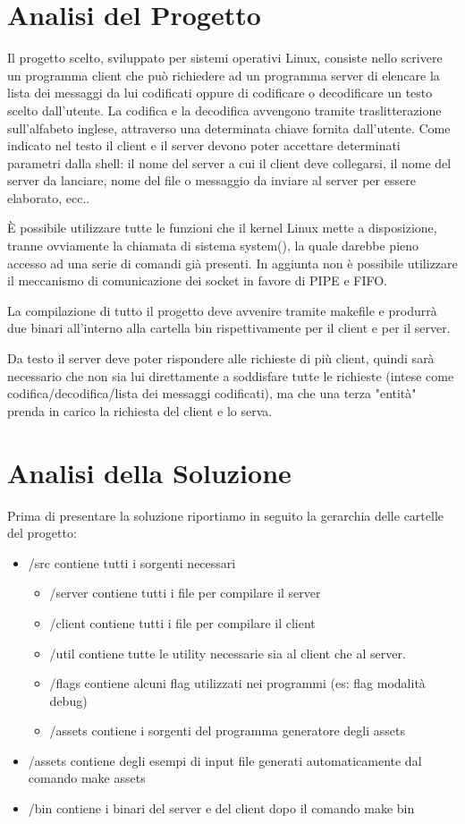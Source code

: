 \documentclass[12pt]{article}
\begin{document}


\section{Analisi del Progetto}
Il progetto scelto, sviluppato per sistemi operativi Linux, consiste nello scrivere un programma client che può richiedere ad un programma server di elencare la lista dei messaggi da lui codificati oppure di codificare o decodificare un testo scelto dall'utente. La codifica e la decodifica avvengono tramite traslitterazione sull'alfabeto inglese, attraverso una determinata chiave fornita dall'utente. Come indicato nel testo il client e il server devono poter accettare determinati parametri dalla shell: il nome del server a cui il client deve collegarsi, il nome del server da lanciare, nome del file o messaggio da inviare al server per essere elaborato, ecc..

È possibile utilizzare tutte le funzioni che il kernel Linux mette a disposizione, tranne ovviamente la chiamata di sistema system(), la quale darebbe pieno accesso ad una serie di comandi già presenti. In aggiunta non è possibile utilizzare il meccanismo di comunicazione dei socket in favore di PIPE e FIFO.

La compilazione di tutto il progetto deve avvenire tramite makefile e produrrà due binari all'interno alla cartella bin rispettivamente per il client e per il server.

Da testo il server deve poter rispondere alle richieste di più client, quindi sarà necessario che non sia lui direttamente a soddisfare tutte le richieste (intese come codifica/decodifica/lista dei messaggi codificati), ma che una terza "entità" prenda in carico la richiesta del client e lo serva.

\section{Analisi della Soluzione}
Prima di presentare la soluzione riportiamo in seguito la gerarchia delle cartelle del progetto:
\begin{itemize}
    \item /src contiene tutti i sorgenti necessari
    \begin{itemize}
        \item /server contiene tutti i file per compilare il server
        \item /client contiene tutti i file per compilare il client
        \item /util contiene tutte le utility necessarie sia al client che al server.
        \item /flags contiene alcuni flag utilizzati nei programmi (es: flag modalità debug)
        \item /assets contiene i sorgenti del programma generatore degli assets
    \end{itemize}
    \item /assets contiene degli esempi di input file generati automaticamente dal comando make assets
    \item /bin contiene i binari del server e del client dopo il comando make bin
\end{itemize}
\end{document}
